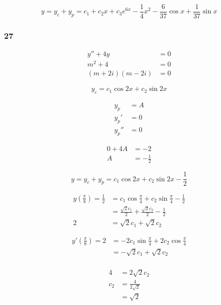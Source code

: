 \documentclass{article}
\begin{document}
\[y = y_c + y_p = c_1 + c_2 x + c_3 e^{6x} - \frac{1}{4} x^2 - \frac{6}{37} \cos x + \frac{1}{37} \sin x\]

\subsubsection{27}

\begin{align*}
  y'' + 4y          & = 0 \\
  m^2 + 4           & = 0 \\
  (m + 2i) (m - 2i) & = 0
\end{align*}

\[y_c = c_1 \cos 2x + c_2 \sin 2x\]

\begin{align*}
  y_p   & = A \\
  y_p'  & = 0 \\
  y_p'' & = 0
\end{align*}

\begin{align*}
  0 + 4A & = -2           \\
  A      & = -\frac{1}{2}
\end{align*}

\[y = y_c + y_p = c_1 \cos 2x + c_2 \sin 2x - \frac{1}{2}\]

\begin{align*}
  y \left( \frac{\pi}{8} \right) = \frac{1}{2} & = c_1 \cos \frac{\pi}{4} + c_2 \sin \frac{\pi}{4} - \frac{1}{2} \\
                                               & = \frac{\sqrt{2} c_1}{2} + \frac{\sqrt{2} c_2}{2} - \frac{1}{2} \\
  2                                            & = \sqrt{2} c_1 + \sqrt{2} c_2
\end{align*}

\begin{align*}
  y' \left( \frac{\pi}{8} \right) = 2 & = -2 c_1 \sin \frac{\pi}{4} + 2 c_2 \cos \frac{\pi}{4} \\
                                      & = -\sqrt{2} c_1 + \sqrt{2} c_2                         \\
\end{align*}

\begin{align*}
  4   & = 2 \sqrt{2} c_2       \\
  c_2 & = \frac{4}{2 \sqrt{2}} \\
      & = \sqrt{2}
\end{align*}
\end{document}
